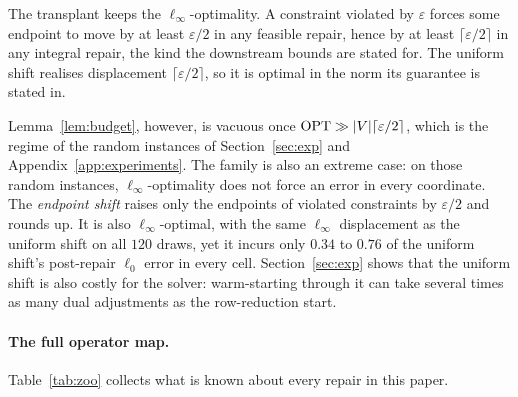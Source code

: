 The transplant keeps the $\ell_\infty$-optimality. A constraint violated by $\varepsilon$
forces some endpoint to move by at least $\varepsilon/2$ in any feasible repair, hence by at least
$\lceil\varepsilon/2\rceil$ in any integral repair, the kind the downstream bounds are stated for.
The uniform shift realises displacement $\lceil\varepsilon/2\rceil$, so it is optimal in the norm
its guarantee is stated in.

Lemma~\ref{lem:budget}, however, is vacuous once $\mathrm{OPT} \gg |V|\lceil\varepsilon/2\rceil$, which is the
regime of the random instances of Section~\ref{sec:exp} and Appendix~\ref{app:experiments}. The
family is also an extreme case: on those random instances, $\ell_\infty$-optimality does not force
an error in every coordinate. The \emph{endpoint shift} raises only the endpoints of violated constraints by
$\varepsilon/2$ and rounds up. It is also $\ell_\infty$-optimal, with the same $\ell_\infty$
displacement as the uniform shift on all $120$ draws, yet it incurs only $0.34$ to $0.76$ of the
uniform shift's post-repair $\ell_0$ error in every cell. Section~\ref{sec:exp} shows that the
uniform shift is also costly for the solver: warm-starting through it can take several times as many
dual adjustments as the row-reduction start.

\paragraph{The full operator map.} Table~\ref{tab:zoo} collects what is known about every repair in
this paper.

